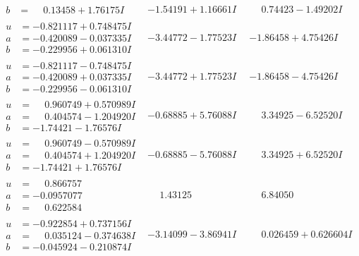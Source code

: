 \documentclass[1p]{elsarticle_modified}
\theoremstyle{definition}
\begin{document}
$$\begin{array}{c|c|c}
\begin{aligned}
b &= \phantom{-}0.13458 + 1.76175 I\end{aligned}
 & -1.54191 + 1.16661 I & \phantom{-}0.74423 - 1.49202 I \\ \hline\begin{aligned}
u &= -0.821117 + 0.748475 I \\
a &= -0.420089 - 0.037335 I \\
b &= -0.229956 + 0.061310 I\end{aligned}
 & -3.44772 - 1.77523 I & -1.86458 + 4.75426 I \\ \hline\begin{aligned}
u &= -0.821117 - 0.748475 I \\
a &= -0.420089 + 0.037335 I \\
b &= -0.229956 - 0.061310 I\end{aligned}
 & -3.44772 + 1.77523 I & -1.86458 - 4.75426 I \\ \hline\begin{aligned}
u &= \phantom{-}0.960749 + 0.570989 I \\
a &= \phantom{-}0.404574 - 1.204920 I \\
b &= -1.74421 - 1.76576 I\end{aligned}
 & -0.68885 + 5.76088 I & \phantom{-}3.34925 - 6.52520 I \\ \hline\begin{aligned}
u &= \phantom{-}0.960749 - 0.570989 I \\
a &= \phantom{-}0.404574 + 1.204920 I \\
b &= -1.74421 + 1.76576 I\end{aligned}
 & -0.68885 - 5.76088 I & \phantom{-}3.34925 + 6.52520 I \\ \hline\begin{aligned}
u &= \phantom{-}0.866757\phantom{ +0.000000I} \\
a &= -0.0957077\phantom{ +0.000000I} \\
b &= \phantom{-}0.622584\phantom{ +0.000000I}\end{aligned}
 & \phantom{-}1.43125\phantom{ +0.000000I} & \phantom{-}6.84050\phantom{ +0.000000I} \\ \hline\begin{aligned}
u &= -0.922854 + 0.737156 I \\
a &= \phantom{-}0.035124 - 0.374638 I \\
b &= -0.045924 - 0.210874 I\end{aligned}
 & -3.14099 - 3.86941 I & \phantom{-}0.026459 + 0.626604 I \\ \hline\begin{aligned}

\end{aligned}
\end{array}$$
\end{document}
